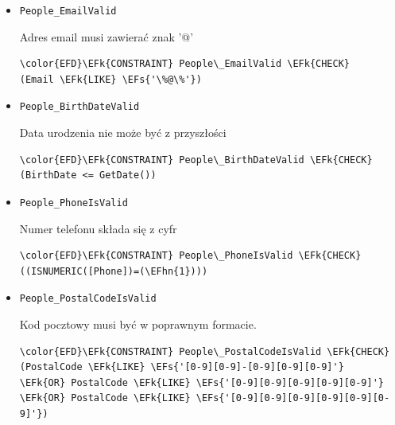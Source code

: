 \documentclass[11pt]{article}
\newcommand{\EFs}[1]{\textcolor{EFs}{#1}} %
\newcommand{\EFk}[1]{\textcolor{EFk}{\textbf{#1}}} %
\newcommand{\EFhn}[1]{\textcolor{EFhn}{#1}} %
\begin{document}
\begin{itemize}
\item \texttt{People\_EmailValid}

Adres email musi zawierać znak '@'

\begin{Code}
\begin{Verbatim}
\color{EFD}\EFk{CONSTRAINT} People\_EmailValid \EFk{CHECK}
(Email \EFk{LIKE} \EFs{'\%@\%'})
\end{Verbatim}
\end{Code}
\item \texttt{People\_BirthDateValid}

Data urodzenia nie może być z przyszłości
\begin{Code}
\begin{Verbatim}
\color{EFD}\EFk{CONSTRAINT} People\_BirthDateValid \EFk{CHECK}
(BirthDate <= GetDate())
\end{Verbatim}
\end{Code}
\item \texttt{People\_PhoneIsValid}

Numer telefonu składa się z cyfr
\begin{Code}
\begin{Verbatim}
\color{EFD}\EFk{CONSTRAINT} People\_PhoneIsValid \EFk{CHECK}
((ISNUMERIC([Phone])=(\EFhn{1})))
\end{Verbatim}
\end{Code}
\item \texttt{People\_PostalCodeIsValid}

Kod pocztowy musi być w poprawnym formacie.
\begin{Code}
\begin{Verbatim}
\color{EFD}\EFk{CONSTRAINT} People\_PostalCodeIsValid \EFk{CHECK}
(PostalCode \EFk{LIKE} \EFs{'[0-9][0-9]-[0-9][0-9][0-9]'}
\EFk{OR} PostalCode \EFk{LIKE} \EFs{'[0-9][0-9][0-9][0-9][0-9]'}
\EFk{OR} PostalCode \EFk{LIKE} \EFs{'[0-9][0-9][0-9][0-9][0-9][0-9]'})
\end{Verbatim}
\end{Code}
\end{itemize}
\end{document}
